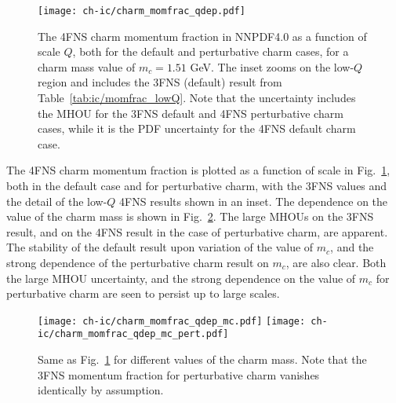 \begin{figure}[h]
  \begin{center}
     \texttt{[image: ch-ic/charm\_momfrac\_qdep.pdf]}
    \caption{\small 
      The 4FNS charm momentum fraction in NNPDF4.0 as a function of scale $Q$,
      both for the default and perturbative charm cases,
      for a charm mass value of $m_c=1.51$ GeV.
     The inset zooms on the low-$Q$ region and includes the 3FNS
     (default) result
     from Table~\ref{tab:ic/momfrac_lowQ}. 
     Note that the uncertainty includes the MHOU for the 3FNS default
     and 4FNS perturbative charm cases, while it is the PDF
     uncertainty for the 4FNS default charm case.
  \label{fig:ic/comparison_IC_models} }
\end{center}
\end{figure}

The 4FNS charm momentum fraction is plotted as a function of scale
in Fig.~\ref{fig:ic/comparison_IC_models}, both in the default case and
for perturbative charm, with the 3FNS values and the detail of the low-$Q$ 
4FNS results shown in an inset.
%
The dependence on the value of the charm mass
is shown in Fig.~\ref{fig:ic/charm_momfrac_qdep_mc}.
The large MHOUs on the 3FNS result, and on the 
4FNS result in the case of perturbative charm, are apparent.
The stability of the default result upon variation of  the value of
$m_c$, and the strong dependence of the perturbative charm result on
$m_c$, are  also clear.
Both the large MHOU uncertainty, and the strong dependence on
the value of $m_c$
for perturbative charm are seen to persist up to large scales.


\begin{figure}[t]
  \begin{center}
    \texttt{[image: ch-ic/charm\_momfrac\_qdep\_mc.pdf]}
    \texttt{[image: ch-ic/charm\_momfrac\_qdep\_mc\_pert.pdf]}
    \caption{\small
    Same as Fig.~\ref{fig:ic/comparison_IC_models} for different values
    of the charm mass. Note that the 3FNS momentum fraction for
     perturbative charm vanishes identically by assumption.
   \label{fig:ic/charm_momfrac_qdep_mc} }
\end{center}
\end{figure}

